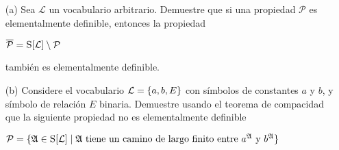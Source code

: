\begin{enumerate}
    \item[(a)] Sea $\mathcal{L}$ un vocabulario arbitrario. Demuestre que si una propiedad $\mathcal{P}$ es elementalmente definible, entonces la propiedad
    \begin{center}
        $\overline{\mathcal{P}}=\textsc{S}[\mathcal{L}]\setminus\mathcal{P}$
    \end{center}
    también es elementalmente definible.
    \item[(b)] Considere el vocabulario $\mathcal{L}=\{a,b,E\}$ con símbolos de constantes $a$ y $b$, y símbolo de relación $E$ binaria. Demuestre usando el teorema de compacidad que la siguiente propiedad no es elementalmente definible
    \begin{center}
        $\mathcal{P}=\{\mathfrak{A}\in\textsc{S}[\mathcal{L}]\mid \mathfrak{A}\text{ tiene un camino de largo finito entre }a^\mathfrak{A}\text{ y }b^\mathfrak{A}\}$
    \end{center}
\end{enumerate}